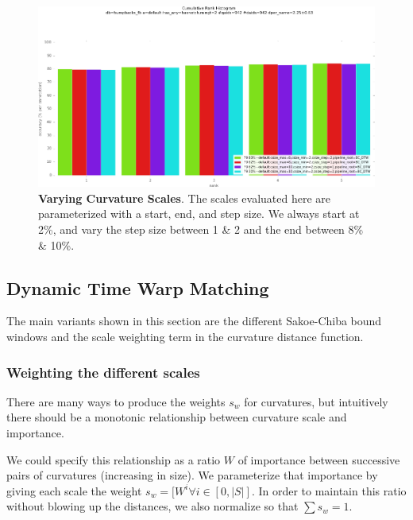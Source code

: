 \begin{figure}[t]%
\centering
\includegraphics[width=1\textwidth]{../images/results/vary_curv_scales.png}
\caption{\textbf{Varying Curvature Scales}. The scales evaluated here are parameterized with a start, end, and step size. We always start at 2\%, and vary the step size between 1 \& 2 and the end between 8\% \& 10\%.}
\label{fig:vary_curv_scales}
\end{figure}

\subsection{Dynamic Time Warp Matching}

The main variants shown in this section are the different Sakoe-Chiba bound windows and the scale weighting term in the curvature distance function.

\subsubsection{Weighting the different scales}

There are many ways to produce the weights $s_w$ for curvatures, but intuitively there should be a monotonic relationship between curvature scale and importance.

We could specify this relationship as a ratio $W$ of importance between successive pairs of curvatures (increasing in size).
We parameterize that importance by giving each scale the weight $s_w = [W^i \forall i \in [0,|S|]$.
In order to maintain this ratio without blowing up the distances, we also normalize so that $\sum s_w = 1$.

